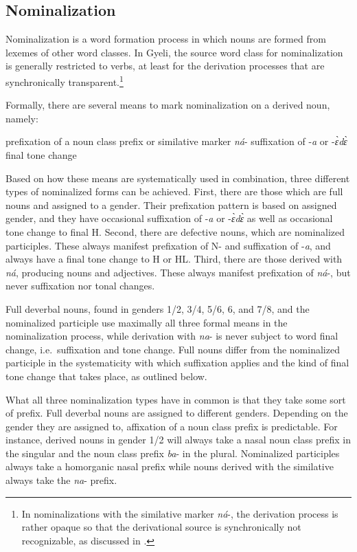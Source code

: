 \subsection{Nominalization}
\label{sec:NOM}


Nominalization is a word formation process in which nouns are formed from lexemes of other word classes. In Gyeli, the source word class for nominalization is generally restricted to verbs, at least for the derivation processes that are synchronically transparent.\footnote{In nominalizations with the similative marker {\itshape ná}-, the derivation process is rather opaque so that the derivational source is synchronically not recognizable, as discussed in .}

Formally, there are several means to mark nominalization on a derived noun, namely:
\begin{enumerate}[label=(\roman*)]
\itshapeem prefixation of a noun class prefix or similative marker {\itshape ná}-
\itshapeem suffixation of -{\itshape a} or -{\itshape ɛ̀dɛ̀}
\itshapeem final tone change
\end{enumerate}

\noindent Based on how these means are systematically used in combination, three different types of nominalized forms can be achieved.  First, there are those which are full nouns and assigned to a gender. Their prefixation pattern is based on assigned gender, and they have occasional suffixation of -{\itshape a} or -{\itshape ɛ̀dɛ̀} as well as  occasional tone change to final H.  Second, there are defective nouns, which are nominalized participles.  These always manifest prefixation of N- and  suffixation of -{\itshape a}, and  always have a final tone change to H or HL.  Third, there are those  derived with {\itshape ná}, producing nouns and adjectives. These always manifest prefixation of {\itshape ná}-, but never suffixation  nor tonal changes.


\noindent Full deverbal nouns, found in genders 1/2, 3/4, 5/6, 6, and 7/8, and the nominalized participle use maximally all three formal means in the nominalization process, while derivation with {\itshape na}- is never subject to word final change, i.e.\ suffixation and tone change. Full nouns differ from the nominalized participle in the systematicity with which suffixation applies and the kind of final tone change that takes place, as outlined below. 

What all three nominalization types have in common is that they take some sort of prefix. Full deverbal nouns are assigned to different genders. Depending on the gender they are assigned to, affixation of a noun class prefix is predictable. For instance, derived nouns in gender 1/2 will always take a nasal noun class prefix in the singular and the noun class prefix {\itshape ba}- in the plural. Nominalized participles always take a homorganic nasal prefix while nouns derived with the similative always take the {\itshape na}- prefix.

